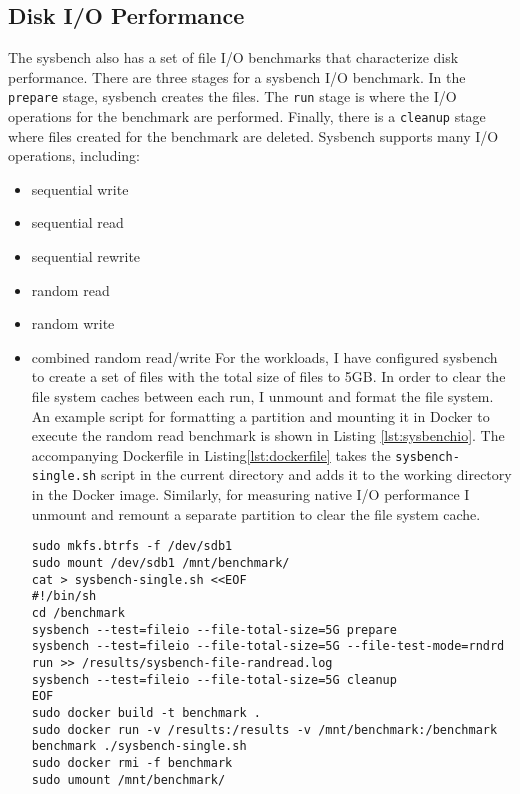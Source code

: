 \documentclass[11pt]{article}
\begin{document}
\subsection{Disk I/O Performance}
The sysbench also has a set of file I/O benchmarks that characterize disk performance. There are three stages for a sysbench I/O benchmark. In the \texttt{prepare} stage, sysbench creates the files. The \texttt{run} stage is where the I/O operations for the benchmark are performed. Finally, there is a \texttt{cleanup} stage where files created for the benchmark are deleted. Sysbench supports many I/O operations, including:
\begin{itemize}
	\item sequential write
	\item sequential read
	\item sequential rewrite
	\item random read
	\item random write
	\item combined random read/write
For the workloads, I have configured sysbench to create a set of files with the total size of files to 5GB. In order to clear the file system caches between each run, I unmount and format the file system. An example script for formatting a partition and mounting it in Docker to execute the random read benchmark is shown in Listing \ref{lst:sysbenchio}. The accompanying Dockerfile in Listing\ref{lst:dockerfile} takes the \texttt{sysbench-single.sh} script in the current directory and adds it to the working directory in the Docker image. Similarly, for measuring native I/O performance I unmount and remount a separate partition to clear the file system cache. 

\lstset{caption=Sysbench File I/O Random Read Bash Script, label=lst:sysbenchio}
\begin{lstlisting}
sudo mkfs.btrfs -f /dev/sdb1
sudo mount /dev/sdb1 /mnt/benchmark/
cat > sysbench-single.sh <<EOF
#!/bin/sh
cd /benchmark
sysbench --test=fileio --file-total-size=5G prepare
sysbench --test=fileio --file-total-size=5G --file-test-mode=rndrd run >> /results/sysbench-file-randread.log
sysbench --test=fileio --file-total-size=5G cleanup
EOF
sudo docker build -t benchmark .
sudo docker run -v /results:/results -v /mnt/benchmark:/benchmark benchmark ./sysbench-single.sh
sudo docker rmi -f benchmark
sudo umount /mnt/benchmark/
\end{lstlisting}

\lstset{caption=Dockerfile for Building Benchmark Image, label=lst:dockerfile}
\begin{lstlisting}


\end{lstlisting}
\end{itemize}
\end{document}
